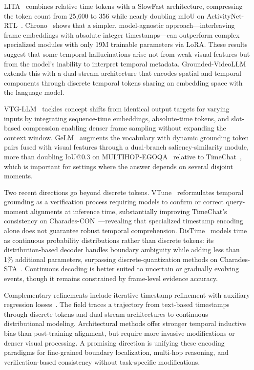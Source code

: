 \documentclass[10pt]{article} %
\begin{document}
LITA~\citep{Huang2024LITALI} combines relative time tokens with a SlowFast architecture, compressing the token count from 25,600 to 356 while nearly doubling mIoU on ActivityNet-RTL~\citep{huang2024lita}. Chrono~\citep{Rodriguez2024ChronoAS} shows that a simpler, model-agnostic approach---interleaving frame embeddings with absolute integer timestamps---can outperform complex specialized modules with only 19M trainable parameters via LoRA. These results suggest that some temporal hallucinations arise not from weak visual features but from the model's inability to interpret temporal metadata. Grounded-VideoLLM~\citep{Wang2024GroundedVideoLLMSF} extends this with a dual-stream architecture that encodes spatial and temporal components through discrete temporal tokens sharing an embedding space with the language model.

VTG-LLM~\citep{Guo2024VTGLLMIT, Guo2025VTGLLMIT} tackles concept shifts from identical output targets for varying inputs by integrating sequence-time embeddings, absolute-time tokens, and slot-based compression enabling denser frame sampling without expanding the context window. GeLM~\citep{Chen2024GroundedMV} augments the vocabulary with dynamic grounding token pairs fused with visual features through a dual-branch saliency-similarity module, more than doubling IoU@0.3 on MULTIHOP-EGOQA~\citep{chen2025grounded} relative to TimeChat~\citep{ren2024timechat}, which is important for settings where the answer depends on several disjoint moments.

Two recent directions go beyond discrete tokens. VTune~\citep{Jung2024OnTC} reformulates temporal grounding as a verification process requiring models to confirm or correct query-moment alignments at inference time, substantially improving TimeChat's consistency on Charades-CON~\citep{jung2025consistency}---revealing that specialized timestamp encoding alone does not guarantee robust temporal comprehension. DisTime~\citep{Zeng2025DisTimeDT} models time as continuous probability distributions rather than discrete tokens: its distribution-based decoder handles boundary ambiguity while adding less than 1\% additional parameters, surpassing discrete-quantization methods on Charades-STA~\citep{gao2017tall}. Continuous decoding is better suited to uncertain or gradually evolving events, though it remains constrained by frame-level evidence accuracy.

Complementary refinements include iterative timestamp refinement with auxiliary regression losses~\citep{Wang2024TimeRefineTG}. The field traces a trajectory from text-based timestamps through discrete tokens and dual-stream architectures to continuous distributional modeling. Architectural methods offer stronger temporal inductive bias than post-training alignment, but require more invasive modifications or denser visual processing. A promising direction is unifying these encoding paradigms for fine-grained boundary localization, multi-hop reasoning, and verification-based consistency without task-specific modifications.
\end{document}
